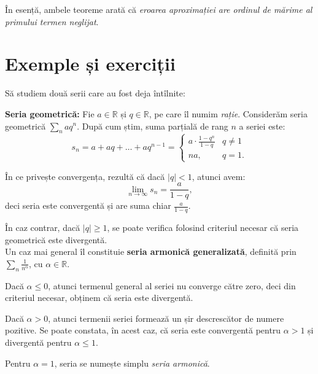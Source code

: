 \documentclass[11pt,a4paper]{article}
\newcommand\RR{\mathbb{R}}
\theoremstyle{dotless}
\theoremstyle{dotlessdr}
\begin{document}
În esență, ambele teoreme arată că \emph{eroarea aproximației are ordinul de mărime %
al primului termen neglijat}.


\section{Exemple și exerciții}

Să studiem două serii care au fost deja întîlnite:

\textbf{Seria geometrică:} Fie $a \in \RR$ și $q \in \RR$, pe care îl numim \emph{rație}.
Considerăm seria geometrică $\sum_n aq^n$. După cum știm, suma parțială de rang $n$
a seriei este:
\[
  s_n = a + aq + \dots + aq^{n-1} = %
  \begin{cases}
    a \cdot \frac{1 - q^n}{1 - q}  & q \neq 1 \\
    na, & q = 1.
  \end{cases}
\]

În ce privește convergența, rezultă că dacă $|q| < 1$, atunci avem:
\[
  \lim_{n \to \infty} s_n = \frac{a}{1 - q},
\]
deci seria este convergentă și are suma chiar $\frac{a}{1 - q}$.

În caz contrar, dacă $|q| \geq 1$, se poate verifica folosind criteriul necesar că seria
geometrică este divergentă. \\

Un caz mai general îl constituie \textbf{seria armonică generalizată}, definită prin
$\sum_n \frac{1}{n^\alpha}$, cu $\alpha \in \RR$.

Dacă $\alpha \leq 0$, atunci termenul general al seriei nu converge către zero, deci din
criteriul necesar, obținem că seria este divergentă.

Dacă $\alpha > 0$, atunci termenii seriei formează un șir descrescător de numere pozitive.
Se poate constata, în acest caz, că seria este convergentă pentru $\alpha > 1$ și divergentă
pentru $\alpha \leq 1$.

Pentru $\alpha = 1$, seria se numește simplu \emph{seria armonică}.

\vspace{1cm}
\end{document}

